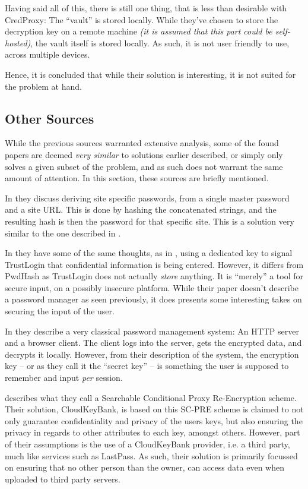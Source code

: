 			Having said all of this, there is still one thing, that is less than desirable with CredProxy: The ``vault'' is stored locally. While they've chosen to store the decryption key on a remote machine \emph{(it is assumed that this part could be self-hosted)}, the vault itself is stored locally. As such, it is not user friendly to use, across multiple devices.

			Hence, it is concluded that while their solution is interesting, it is not suited for the problem at hand.



		\subsection*{Other Sources}
			While the previous sources warranted extensive analysis, some of the found papers are deemed \emph{very similar} to solutions earlier described, or simply only solves a given subset of the problem, and as such does not warrant the same amount of attention. In this section, these sources are briefly mentioned. 

			In \cite{halderman2005} they discuss deriving site specific passwords, from a single master password and a site URL. This is done by hashing the concatenated strings, and the resulting hash is then the password for that specific site. This is a solution very similar to the one described in \cite{pwdhash}.

			In \cite{zhang2015} they have some of the same thoughts, as in \cite{pwdhash}, using a dedicated key to signal TrustLogin that confidential information is being entered. However, it differs from PwdHash as TrustLogin does not actually \emph{store} anything. It is ``merely'' a tool for secure input, on a possibly insecure platform. While their paper doesn't describe a password manager as seen previously, it does presents some interesting takes on securing the input of the user.

			In \cite{englert2009} they describe a very classical password management system: An HTTP server and a browser client. The client logs into the server, gets the encrypted data, and decrypts it locally. However, from their description of the system, the encryption key -- or as they call it the ``secret key'' -- is something the user is supposed to remember and input \emph{per} session. 

			\cite{huang2015} describes what they call a Searchable Conditional Proxy Re-Encryption scheme. Their solution, CloudKeyBank, is based on this SC-PRE scheme is claimed to not only guarantee confidentiality and privacy of the users keys, but also ensuring the privacy in regards to other attributes to each key, amongst others. However, part of their assumptions is the use of a CloudKeyBank provider, i.e. a third party, much like services such as LastPass. As such, their solution is primarily focussed on ensuring that no other person than the owner, can access data even when uploaded to third party servers.

